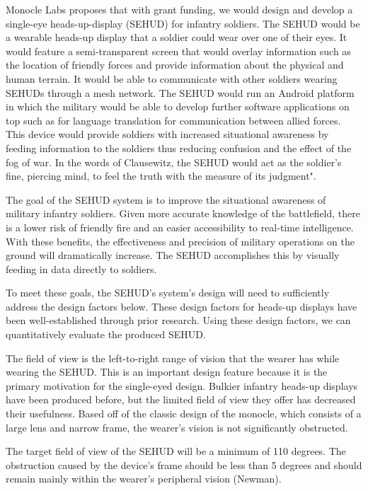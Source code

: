 Monocle Labs proposes that with grant funding, we would design and develop
a single-eye heads-up-display (SEHUD) for infantry soldiers. The SEHUD would be
a wearable heads-up display that a soldier could wear over one of their eyes.
It would feature a semi-transparent screen that would overlay information such
as the location of friendly forces and provide information about the physical
and human terrain. It would be able to communicate with other soldiers wearing
SEHUDs through a mesh network. The SEHUD would run an Android platform in which
the military would be able to develop further software applications on top such
as for language translation for communication between allied forces. This
device would provide soldiers with increased situational awareness by feeding
information to the soldiers thus reducing confusion and the effect of the fog
of war. In the words of Clausewitz, the SEHUD would act as the soldier's
fine, piercing mind, to feel the truth with the measure of its judgment".

The goal of the SEHUD system is to improve the situational awareness of
military infantry soldiers. Given more accurate knowledge of the battlefield,
there is a lower risk of friendly fire and an easier accessibility to real-time
intelligence. With these benefits, the effectiveness and precision of military
operations on the ground will dramatically increase. The SEHUD accomplishes
this by visually feeding in data directly to soldiers.

To meet these goals, the SEHUD's system's design will need to sufficiently
address the design factors below. These design factors for heads-up displays
have been well-established through prior research. Using these design factors,
we can quantitatively evaluate the produced SEHUD.

The field of view is the left-to-right range of vision that the wearer has while
wearing the SEHUD. This is an important design feature because it is the
primary motivation for the single-eyed design. Bulkier infantry heads-up
displays have been produced before, but the limited field of view they offer
has decreased their usefulness. Based off of the classic design of the monocle,
which consists of a large lens and narrow frame, the wearer's vision is not
significantly obstructed.

The target field of view of the SEHUD will be a minimum of 110 degrees. The
obstruction caused by the device's frame should be less than 5 degrees and
should remain mainly within the wearer's peripheral vision (Newman).

